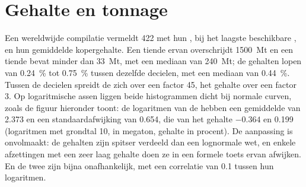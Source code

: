\section{Gehalte en tonnage}\label{sec:b2:ore-deposits:grade-tonnage}

Een wereldwijde compilatie vermeldt 422  met hun , bij het laagste beschikbare
, en hun gemiddelde kopergehalte. Een tiende ervan overschrijdt \qty{1500}{Mt} en een tiende bevat minder
dan \qty{33}{Mt}, met een mediaan van \qty{240}{Mt}; de gehalten lopen van \qty{0.24}{\percent} tot
\qty{0.75}{\percent} tussen dezelfde decielen, met een mediaan van \qty{0.44}{\percent}. Tussen de
decielen spreidt de  zich over een factor 45, het gehalte over een factor 3. Op logaritmische assen liggen beide histogrammen dicht bij normale curven, zoals de figuur hieronder toont:
de logaritmen van de  hebben een gemiddelde van 2.373 en een standaardafwijking van 0.654, die van het gehalte
$-0.364$ en 0.199 (logaritmen met grondtal 10,  in megaton, gehalte in procent). De aanpassing is
onvolmaakt: de gehalten zijn spitser verdeeld dan een lognormale wet, en enkele afzettingen met een zeer laag gehalte doen
ze in een formele toets ervan afwijken. En de twee zijn bijna onafhankelijk, met een correlatie van
0.1 tussen hun logaritmen.

